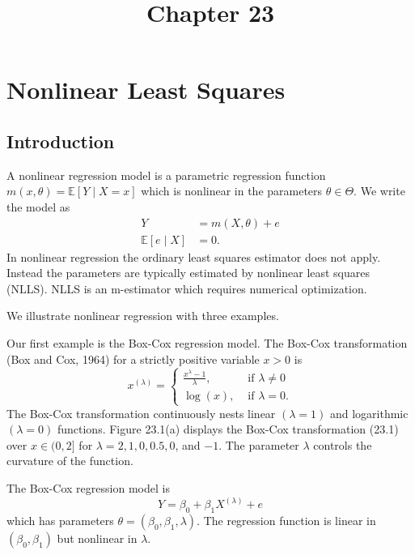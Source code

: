 \documentclass[10pt]{article}
\title{Chapter 23 }
\author{}
\date{}
\begin{document}
\maketitle
\section{Nonlinear Least Squares}
\subsection{Introduction}
A nonlinear regression model is a parametric regression function $m(x, \theta)=\mathbb{E}[Y \mid X=x]$ which is nonlinear in the parameters $\theta \in \Theta$. We write the model as
$$
\begin{aligned}
Y &=m(X, \theta)+e \\
\mathbb{E}[e \mid X] &=0 .
\end{aligned}
$$
In nonlinear regression the ordinary least squares estimator does not apply. Instead the parameters are typically estimated by nonlinear least squares (NLLS). NLLS is an m-estimator which requires numerical optimization.

We illustrate nonlinear regression with three examples.

Our first example is the Box-Cox regression model. The Box-Cox transformation (Box and Cox, 1964) for a strictly positive variable $x>0$ is
$$
x^{(\lambda)}= \begin{cases}\frac{x^{\lambda}-1}{\lambda}, & \text { if } \lambda \neq 0 \\ \log (x), & \text { if } \lambda=0 .\end{cases}
$$
The Box-Cox transformation continuously nests linear $(\lambda=1)$ and logarithmic $(\lambda=0)$ functions. Figure 23.1(a) displays the Box-Cox transformation (23.1) over $x \in(0,2]$ for $\lambda=2,1,0,0.5,0$, and $-1$. The parameter $\lambda$ controls the curvature of the function.

The Box-Cox regression model is
$$
Y=\beta_{0}+\beta_{1} X^{(\lambda)}+e
$$
which has parameters $\theta=\left(\beta_{0}, \beta_{1}, \lambda\right)$. The regression function is linear in $\left(\beta_{0}, \beta_{1}\right)$ but nonlinear in $\lambda$.
\end{document}
